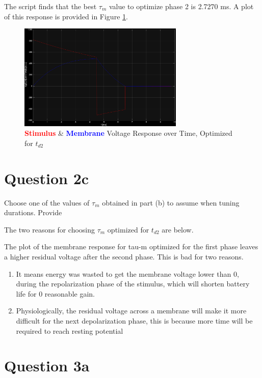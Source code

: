 \documentclass[]{report}
\begin{document}
The script finds that the best $\tau_m$ value to optimize phase 2 is 2.7270 ms. A plot of this response is provided in Figure \ref{fig:phase2}.

\begin{figure}[H]
	\centering
	\includegraphics[width=0.7\textwidth]{phase2_response.png}
	\caption{\textcolor{red}{\textbf{Stimulus}} \& \textcolor{blue}{\textbf{Membrane}} Voltage Response over Time, Optimized for $t_{d2}$}
	\label{fig:phase2}
\end{figure}


\section*{Question 2c}

Choose one of the values of $\tau_m$ obtained in part (b) to assume when tuning durations. Provide 

The two  reasons for choosing $\tau_m$ optimized for $t_{d2}$ are below.


The plot of the membrane response for tau-m optimized for the  first phase leaves a higher residual voltage after the second phase. This is bad for two reasons.

\begin{enumerate}
	\item It means energy was wasted to get the membrane voltage lower than 0, during the repolarization phase of the stimulus, which will shorten battery life for 0 reasonable gain.
	
	\item Physiologically, the residual voltage across a membrane will make it more difficult for the next depolarization phase, this is because more time will be required to reach resting potential
\end{enumerate}


\section*{Question 3a}
\end{document}
